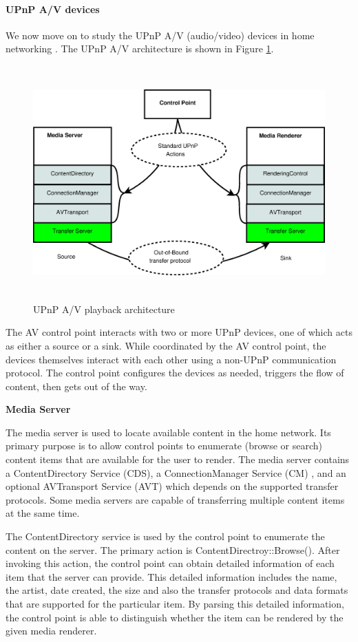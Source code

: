 \paragraph{UPnP A/V devices\label{2_2_1_2}}
We now move on to study the UPnP A/V (audio/video) devices in home networking
\label{upnpav}. The UPnP A/V architecture is shown in Figure
\ref{upnp_playback}.

\begin{figure}[hb] 
\centering \includegraphics[height=9cm]{charts/upnp_playback} 
\caption{UPnP A/V playback architecture \label{upnp_playback}} 
\end{figure}

The AV control point interacts with two or more UPnP
devices, one of which acts as either a source or a sink. While coordinated by
the AV control point, the devices themselves interact with each other using a
non-UPnP communication protocol. The control point configures the devices as
needed, triggers the flow of content, then gets out of the way.

\textbf{Media Server}

The media server is used to locate available content in the home network. Its 
primary purpose is to allow control points to enumerate (browse or search) 
content items that are available for the user to render. The media server 
contains a ContentDirectory Service (CDS), a ConnectionManager Service (CM) 
, and an optional AVTransport Service (AVT) which depends on the supported 
transfer protocols. Some media servers are capable of transferring multiple 
content items at the same time. 

The ContentDirectory service is used by the control point to enumerate the content 
on the server. The primary action is ContentDirectroy::Browse(). After 
invoking this action, the control point can obtain detailed information of each 
item that the server can provide. This detailed information includes the name, 
the artist, date created, the size and also the transfer protocols and data formats that are
supported for the particular item. By parsing this detailed information, 
the control point is able to distinguish whether the item can be rendered by the 
given media renderer. 

